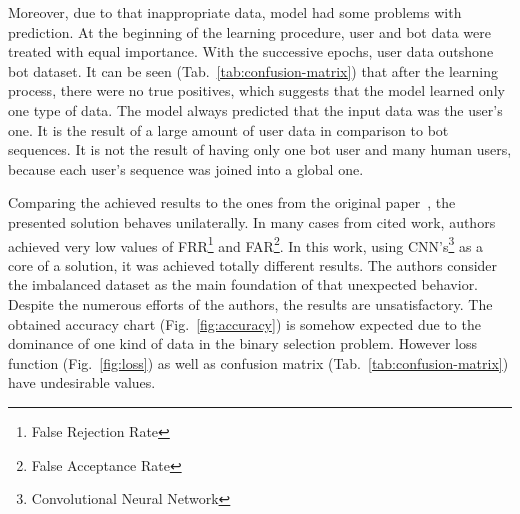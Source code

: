 Moreover, due to that inappropriate data, model had some problems with prediction.
At the beginning of the learning procedure, user and bot data were treated with equal importance.
With the successive epochs, user data outshone bot dataset.
It can be seen \mbox{(Tab.~\ref{tab:confusion-matrix})} that after the learning process, there were no true positives, which suggests that the model learned only one type of data.
The model always predicted that the input data was the user's one.
It is the result of a large amount of user data in comparison to bot sequences.
It is not the result of having only one bot user and many human users, because each user's sequence was joined into a global one.

Comparing the achieved results to the ones from the original paper~\cite{Main}, the presented solution behaves unilaterally.
In many cases from cited work, authors achieved very low values of FRR\footnote{False Rejection Rate} and FAR\footnote{False Acceptance Rate}\@.
In this work, using CNN's\footnote{Convolutional Neural Network} as a core of a solution, it was achieved totally different results.
The authors consider the imbalanced dataset as the main foundation of that unexpected behavior.
Despite the numerous efforts of the authors, the results are unsatisfactory.
The obtained accuracy chart (Fig.~\ref{fig:accuracy}) is somehow expected due to the dominance of one kind of data in the binary selection problem.
However loss function (Fig.~\ref{fig:loss}) as well as confusion matrix (Tab.~\ref{tab:confusion-matrix}) have undesirable values.
